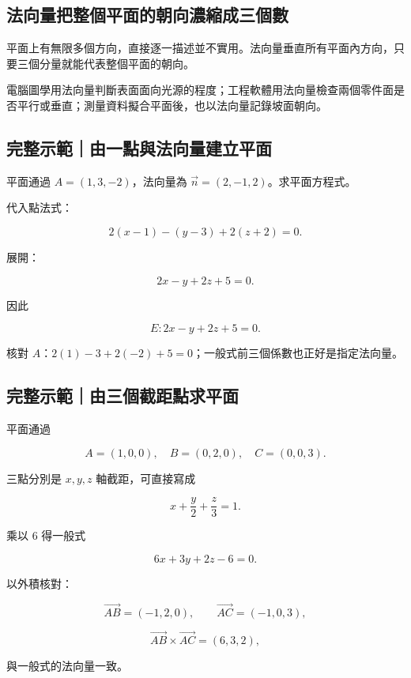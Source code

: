\documentclass[11pt,a4paper]{article}
\begin{document}
\subsection{法向量把整個平面的朝向濃縮成三個數}\label{ux6cd5ux5411ux91cfux628aux6574ux500bux5e73ux9762ux7684ux671dux5411ux6fc3ux7e2eux6210ux4e09ux500bux6578}

平面上有無限多個方向，直接逐一描述並不實用。法向量垂直所有平面內方向，只要三個分量就能代表整個平面的朝向。

電腦圖學用法向量判斷表面面向光源的程度；工程軟體用法向量檢查兩個零件面是否平行或垂直；測量資料擬合平面後，也以法向量記錄坡面朝向。

\begin{HandoutWorkedExample}

\subsection{完整示範｜由一點與法向量建立平面}\label{ux5b8cux6574ux793aux7bc4ux7531ux4e00ux9edeux8207ux6cd5ux5411ux91cfux5efaux7acbux5e73ux9762}

平面通過 \(A=(1,3,-2)\)，法向量為 \(\vec n=(2,-1,2)\)。求平面方程式。

代入點法式：

\[
2(x-1)-(y-3)+2(z+2)=0.
\]

展開：

\[
2x-y+2z+5=0.
\]

因此

\[
\boxed{E:2x-y+2z+5=0}.
\]

核對 \(A\)：\(2(1)-3+2(-2)+5=0\)；一般式前三個係數也正好是指定法向量。

\end{HandoutWorkedExample}

\begin{HandoutWorkedExample}

\subsection{完整示範｜由三個截距點求平面}\label{ux5b8cux6574ux793aux7bc4ux7531ux4e09ux500bux622aux8dddux9edeux6c42ux5e73ux9762}

平面通過

\[
A=(1,0,0),\quad B=(0,2,0),\quad C=(0,0,3).
\]

三點分別是 \(x,y,z\) 軸截距，可直接寫成

\[
\boxed{x+\frac y2+\frac z3=1}.
\]

乘以 \(6\) 得一般式

\[
\boxed{6x+3y+2z-6=0}.
\]

以外積核對：

\[
\overrightarrow{AB}=(-1,2,0),
\qquad
\overrightarrow{AC}=(-1,0,3),
\]

\[
\overrightarrow{AB}\times\overrightarrow{AC}
=(6,3,2),
\]

與一般式的法向量一致。

\end{HandoutWorkedExample}
\end{document}
